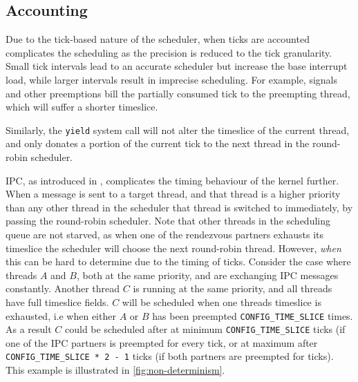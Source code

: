 \subsection{Accounting}
Due to the tick-based nature of the \selfour scheduler, when ticks are accounted complicates the
scheduling as the precision is reduced to the tick granularity. Small tick intervals lead to an
accurate scheduler but increase the base interrupt load, while larger intervals result in imprecise
scheduling.  For example, signals and other preemptions bill the partially consumed tick to the
preempting thread, which will suffer a shorter timeslice. 

Similarly, the \texttt{yield} system call will not alter the timeslice of the current thread, and
only donates a portion of the current tick to the next thread in the round-robin scheduler. 

\gls{IPC}, as introduced in , complicates the timing behaviour of the kernel further.
When a message is sent to a target thread, and that thread is a higher priority than any other
thread in the scheduler that thread is switched to immediately, by passing the round-robin scheduler.
Note that other threads in the scheduling queue are not starved, as when one of the rendezvous partners exhausts its timeslice the scheduler will choose the next round-robin thread.
However, \textit{when} this can be hard to determine due to the timing of ticks. 
Consider the case where threads $A$ and $B$, both at the same priority, and are exchanging IPC messages constantly.
Another thread $C$ is running at the same priority, and all threads have full timeslice fields.
$C$ will be scheduled when one threads timeslice is exhausted, i.e when either $A$ or $B$ has been preempted \texttt{CONFIG\_TIME\_SLICE} times.
As a result $C$ could be scheduled after at minimum \texttt{CONFIG\_TIME\_SLICE} ticks (if one of the \gls{IPC} partners is preempted for every tick, or at maximum after \texttt{CONFIG\_TIME\_SLICE * 2 - 1} ticks (if both partners are preempted for ticks).
This example is illustrated in \cref{fig:non-determinism}.

